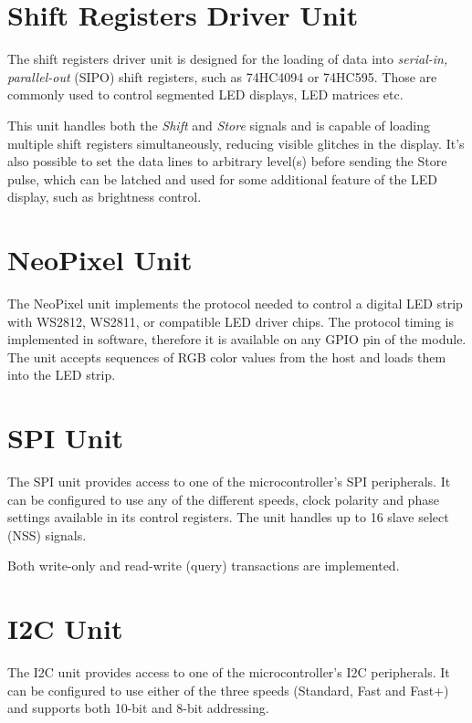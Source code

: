 \section{Shift Registers Driver Unit}

The shift registers driver unit is designed for the loading of data into \textit{serial-in, parallel-out} (SIPO) shift registers, such as 74HC4094 or 74HC595. Those are commonly used to control segmented LED displays, LED matrices etc.

This unit handles both the \textit{Shift} and \textit{Store} signals and is capable of loading multiple shift registers simultaneously, reducing visible glitches in the display. It's also possible to set the data lines to arbitrary level(s) before sending the Store pulse, which can be latched and used for some additional feature of the LED display, such as brightness control.


\section{NeoPixel Unit}

The NeoPixel unit implements the protocol needed to control a digital LED strip with WS2812, WS2811, or compatible LED driver chips. The protocol timing is implemented in software, therefore it is available on any GPIO pin of the module. The unit accepts sequences of RGB color values from the host and loads them into the LED strip.


\section{SPI Unit}

The SPI unit provides access to one of the microcontroller's SPI peripherals. It can be configured to use any of the different speeds, clock polarity and phase settings available in its control registers. The unit handles up to 16 slave select (NSS) signals.

Both write-only and read-write (query) transactions are implemented.



\section{I2C Unit}

The I2C unit provides access to one of the microcontroller's I2C peripherals. It can be configured to use either of the three speeds (Standard, Fast and Fast+) and supports both 10-bit and 8-bit addressing.


